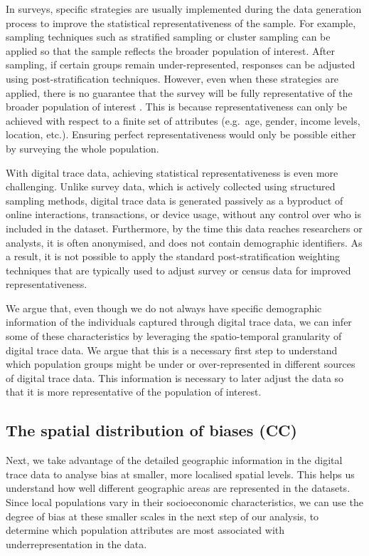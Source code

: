 \documentclass[]{rsos}%
\begin{document}
In surveys, specific strategies are usually implemented during the data
generation process to improve the statistical representativeness of the
sample. For example, sampling techniques such as stratified sampling or
cluster sampling can be applied so that the sample reflects the broader
population of interest. After sampling, if certain groups remain
under-represented, responses can be adjusted using post-stratification
techniques. However, even when these strategies are applied, there is no
guarantee that the survey will be fully representative of the broader
population of interest \citep{cochran1977sampling}. This is because
representativeness can only be achieved with respect to a finite set of
attributes (e.g.~age, gender, income levels, location, etc.). Ensuring
perfect representativeness would only be possible either by surveying
the whole population.

With digital trace data, achieving statistical representativeness is
even more challenging. Unlike survey data, which is actively collected
using structured sampling methods, digital trace data is generated
passively as a byproduct of online interactions, transactions, or device
usage, without any control over who is included in the dataset.
Furthermore, by the time this data reaches researchers or analysts, it
is often anonymised, and does not contain demographic identifiers. As a
result, it is not possible to apply the standard post-stratification
weighting techniques that are typically used to adjust survey or census
data for improved representativeness.

We argue that, even though we do not always have specific demographic
information of the individuals captured through digital trace data, we
can infer some of these characteristics by leveraging the
spatio-temporal granularity of digital trace data. We argue that this is
a necessary first step to understand which population groups might be
under or over-represented in different sources of digital trace data.
This information is necessary to later adjust the data so that it is
more representative of the population of interest.

\hypertarget{the-spatial-distribution-of-biases-cc}{%
\subsection{The spatial distribution of biases (CC)}\label{the-spatial-distribution-of-biases-cc}}

Next, we take advantage of the detailed geographic information in the
digital trace data to analyse bias at smaller, more localised spatial
levels. This helps us understand how well different geographic areas are
represented in the datasets. Since local populations vary in their
socioeconomic characteristics, we can use the degree of bias at these
smaller scales in the next step of our analysis, to determine which
population attributes are most associated with underrepresentation in
the data.
\end{document}

